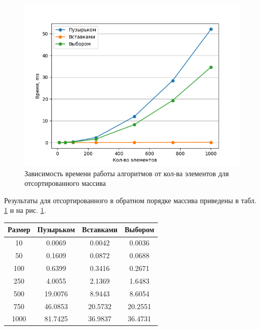 \begin{figure}[!h]
	\centering
	\includegraphics[scale=0.9]{imgs/forward.png}
	\caption{Зависимость времени работы алгоритмов от кол-ва элементов для отсортированного массива}
	\label{img:profiling-fwd}
\end{figure}
\newpage

Результаты для отсортированного в обратном порядке массива приведены в табл. \ref{tab:profiling-reverse} и на рис. \ref{tab:profiling-reverse}.
\begin{table}[!ht]
	\begin{center}
		\begin{tabular}{|c|c|c|c|} 
			\hline
			Размер & Пузырьком & Вставками & Выбором \\  
			\hline
			10 & 0.0069 & 0.0042 & 0.0036 \\
			\hline
			50 & 0.1609 & 0.0872 & 0.0688 \\
			\hline
			100 & 0.6399 & 0.3416 & 0.2671 \\
			\hline
			250 & 4.0055 & 2.1369 & 1.6483 \\
			\hline
			500 & 19.0076 & 8.9443 & 8.6054 \\
			\hline
			750 & 46.0853 & 20.5732 & 20.2551 \\
			\hline
			1000 & 81.7425 & 36.9837 & 36.4731 \\
			\hline
		\end{tabular}
		\label{tab:profiling-reverse}
	\end{center}
\end{table}

